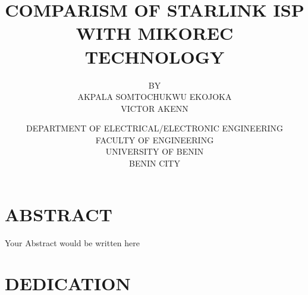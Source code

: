 \documentclass[a4size, 12pt]{report}
\title{COMPARISM OF STARLINK ISP WITH MIKOREC TECHNOLOGY}
\author{BY \\
		AKPALA SOMTOCHUKWU EKOJOKA\\
		VICTOR AKENN}
\date{DEPARTMENT OF ELECTRICAL/ELECTRONIC ENGINEERING\\
FACULTY OF ENGINEERING\\
UNIVERSITY OF BENIN\\
BENIN CITY}
\begin{document}
\maketitle
\chapter*{ABSTRACT}
Your Abstract would be written here
\chapter*{DEDICATION}

\end{document}
